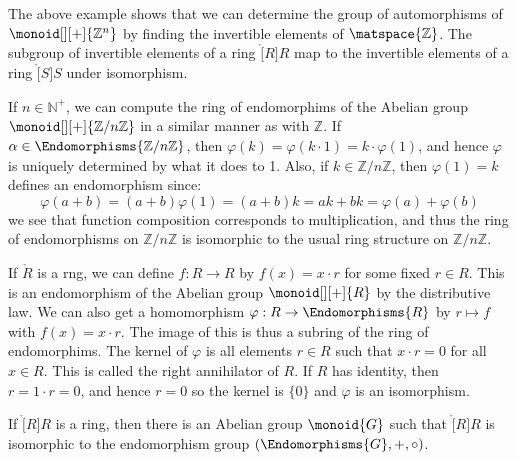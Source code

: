 \documentclass{article}                                                        %
\begin{document}
                The above example shows that we can determine the group of
                automorphisms of $\monoid[][+]{\mathbb{Z}^{n}}$ by finding the
                invertible elements of $\matspace{\mathbb{Z}}$. The subgroup of
                invertible elements of a ring $\ring[R]{R}$ map to the
                invertible elements of a ring $\ring[S]{S}$ under isomorphism.
                \begin{example}
                    If $n\in\mathbb{N}^{+}$, we can compute the ring of
                    endomorphims of the Abelian group
                    $\monoid[][+]{\mathbb{Z}/n\mathbb{Z}}$ in a similar manner
                    as with $\mathbb{Z}$. If
                    $\alpha\in\Endomorphisms{\mathbb{Z}/n\mathbb{Z}}$, then
                    $\varphi(k)=\varphi(k\cdot{1})=k\cdot\varphi(1)$, and hence
                    $\varphi$ is uniquely determined by what it does to 1. Also,
                    if $k\in\mathbb{Z}/n\mathbb{Z}$, then $\varphi(1)=k$ defines
                    an endomorphism since:
                    \begin{equation}
                        \varphi(a+b)=(a+b)\varphi(1)
                            =(a+b)k
                            =ak+bk
                            =\varphi(a)+\varphi(b)
                    \end{equation}
                    we see that function composition corresponds to
                    multiplication, and thus the ring of endomorphisms on
                    $\mathbb{Z}/n\mathbb{Z}$ is isomorphic to the usual ring
                    structure on $\mathbb{Z}/n\mathbb{Z}$.
                \end{example}
                If $\ring{R}$ is a rng, we can define $f:R\rightarrow{R}$ by
                $f(x)=x\cdot{r}$ for some fixed $r\in{R}$. This is an
                endomorphism of the Abelian group $\monoid[][+]{R}$ by the
                distributive law. We can also get a homomorphism
                $\varphi:R\rightarrow\Endomorphisms{R}$ by
                $r\mapsto{f}$ with $f(x)=x\cdot{r}$. The image of this is thus
                a subring of the ring of endomorphims. The kernel of $\varphi$
                is all elements $r\in{R}$ such that $x\cdot{r}=0$ for all
                $x\in{R}$. This is called the right annihilator of $R$. If $R$
                has identity, then $r=1\cdot{r}=0$, and hence $r=0$ so the
                kernel is $\{0\}$ and $\varphi$ is an isomorphism.
                \begin{theorem}
                    If $\ring[R]{R}$ is a ring, then there is an Abelian group
                    $\monoid{G}$ such that $\ring[R]{R}$ is isomorphic to the
                    endomorphism group $(\Endomorphisms{G},+,\circ)$.
                \end{theorem}
\end{document}
